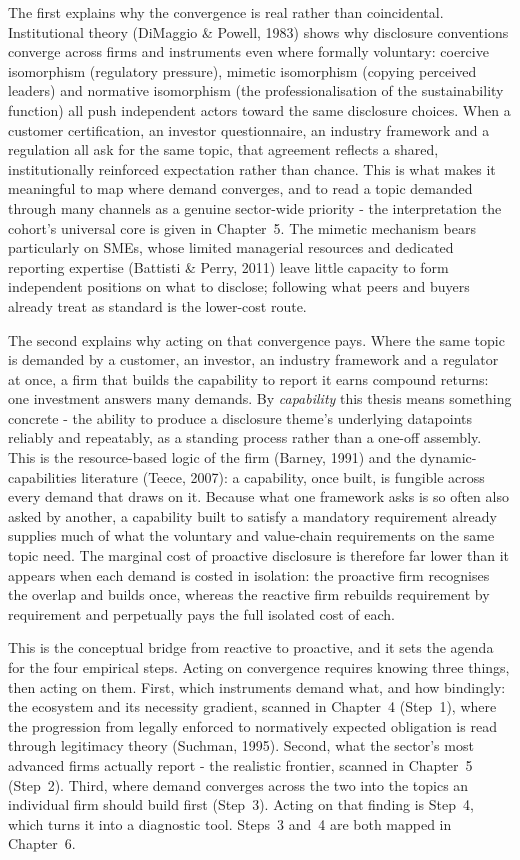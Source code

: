 \documentclass[
]{article}
\begin{document}
The first explains why the convergence is real rather than coincidental.
Institutional theory (DiMaggio \& Powell, 1983) shows why disclosure conventions
converge across firms and instruments even where formally voluntary: coercive
isomorphism (regulatory pressure), mimetic isomorphism (copying perceived leaders)
and normative isomorphism (the professionalisation of the sustainability function)
all push independent actors toward the same disclosure choices. When a customer
certification, an investor questionnaire, an industry framework and a regulation
all ask for the same topic, that agreement reflects a shared, institutionally
reinforced expectation rather than chance. This is what makes it meaningful to map
where demand converges, and to read a topic demanded through many channels as a
genuine sector-wide priority - the interpretation the cohort's universal core is
given in Chapter~5. The mimetic mechanism bears particularly on SMEs, whose
limited managerial resources and dedicated reporting expertise (Battisti \&
Perry, 2011) leave little capacity to form independent positions on what to
disclose; following what peers and buyers already treat as standard is the
lower-cost route.

The second explains why acting on that convergence pays. Where the same topic is
demanded by a customer, an investor, an industry framework and a regulator at once,
a firm that builds the capability to report it earns compound returns: one
investment answers many demands. By \emph{capability} this thesis means something
concrete - the ability to produce a disclosure theme's underlying datapoints
reliably and repeatably, as a standing process rather than a one-off assembly. This
is the resource-based logic of the firm (Barney, 1991) and the dynamic-capabilities
literature (Teece, 2007): a capability, once built, is fungible across every demand
that draws on it. Because what one framework asks is so often also asked by another,
a capability built to satisfy a mandatory requirement already supplies much of what
the voluntary and value-chain requirements on the same topic need. The marginal
cost of proactive disclosure is therefore far lower than it appears when each
demand is costed in isolation: the proactive firm recognises the overlap and builds
once, whereas the reactive firm rebuilds requirement by requirement and perpetually
pays the full isolated cost of each.

This is the conceptual bridge from reactive to proactive, and it sets the agenda
for the four empirical steps. Acting on convergence requires knowing three things,
then acting on them. First, which instruments demand what, and how bindingly: the
ecosystem and its necessity gradient, scanned in Chapter~4 (Step~1), where the
progression from legally enforced to normatively expected obligation is read
through legitimacy theory (Suchman, 1995). Second, what the sector's most advanced
firms actually report - the realistic frontier, scanned in Chapter~5 (Step~2).
Third, where demand converges across the two into the topics an individual firm
should build first (Step~3). Acting on that finding is Step~4, which turns it into
a diagnostic tool. Steps~3 and~4 are both mapped in Chapter~6.
\end{document}
